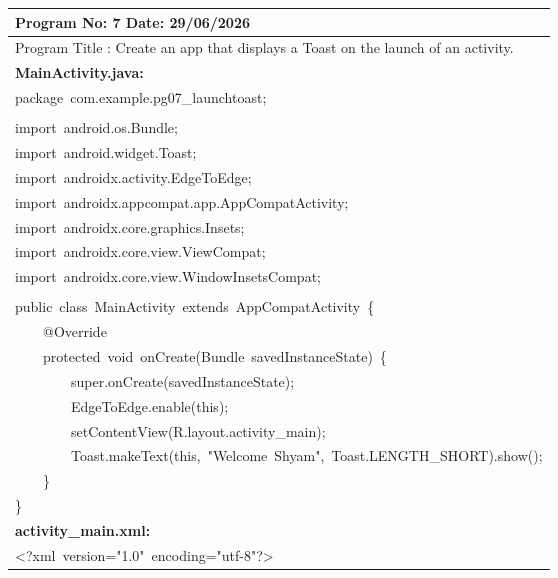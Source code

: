 \documentclass[a4paper,12pt]{article}
\begin{document}
\noindent\begingroup
\renewcommand{\arraystretch}{1.1}
\begin{longtable}{|p{}|}
\hline\endfirsthead\hline\endhead\hline\endfoot\hline\endlastfoot
\rule{0pt}{13pt}Program No: 7 \hfill Date: 29/06/2026 \\
\hline
\rule{0pt}{13pt}Program Title : Create an app that displays a Toast on the launch of an activity. \\
\hline
\rule{0pt}{13pt}\textbf{MainActivity.java:} \\
\hline
{\ttfamily\small package\ com.example.pg07\_launchtoast;} \\
\strut \\
{\ttfamily\small import\ android.os.Bundle;} \\
{\ttfamily\small import\ android.widget.Toast;} \\
{\ttfamily\small import\ androidx.activity.EdgeToEdge;} \\
{\ttfamily\small import\ androidx.appcompat.app.AppCompatActivity;} \\
{\ttfamily\small import\ androidx.core.graphics.Insets;} \\
{\ttfamily\small import\ androidx.core.view.ViewCompat;} \\
{\ttfamily\small import\ androidx.core.view.WindowInsetsCompat;} \\
\strut \\
{\ttfamily\small public\ class\ MainActivity\ extends\ AppCompatActivity\ \{} \\
{\ttfamily\small \ \ \ \ @Override} \\
{\ttfamily\small \ \ \ \ protected\ void\ onCreate(Bundle\ savedInstanceState)\ \{} \\
{\ttfamily\small \ \ \ \ \ \ \ \ super.onCreate(savedInstanceState);} \\
{\ttfamily\small \ \ \ \ \ \ \ \ EdgeToEdge.enable(this);} \\
{\ttfamily\small \ \ \ \ \ \ \ \ setContentView(R.layout.activity\_main);} \\
{\ttfamily\small \ \ \ \ \ \ \ \ Toast.makeText(this,\ "Welcome\ Shyam",\ Toast.LENGTH\_SHORT).show();} \\
{\ttfamily\small \ \ \ \ \}} \\
{\ttfamily\small \}} \\
\hline
\rule{0pt}{13pt}\textbf{activity\_main.xml:} \\
\hline
{\ttfamily\small \textless{}?xml\ version="1.0"\ encoding="utf-8"?\textgreater{}} \\

\end{longtable}
\end{document}
